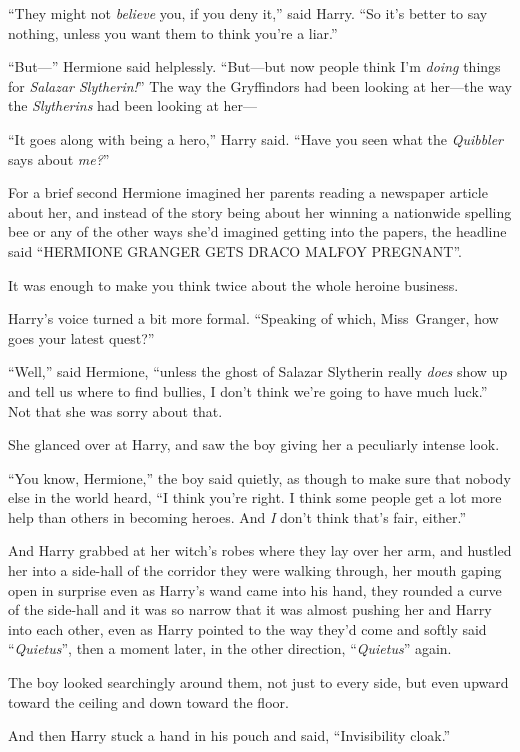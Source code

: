 “They might not \emph{believe} you, if you deny it,” said Harry. “So it’s better to say nothing, unless you want them to think you’re a liar.”

“But—” Hermione said helplessly. “But—but now people think I’m \emph{doing} things for \emph{Salazar Slytherin!}” The way the Gryffindors had been looking at her—the way the \emph{Slytherins} had been looking at her—

“It goes along with being a hero,” Harry said. “Have you seen what the \emph{Quibbler} says about \emph{me?}”

For a brief second Hermione imagined her parents reading a newspaper article about her, and instead of the story being about her winning a nationwide spelling bee or any of the other ways she’d imagined getting into the papers, the headline said “HERMIONE GRANGER GETS DRACO MALFOY PREGNANT”.

It was enough to make you think twice about the whole heroine business.

Harry’s voice turned a bit more formal. “Speaking of which, Miss~Granger, how goes your latest quest?”

“Well,” said Hermione, “unless the ghost of Salazar Slytherin really \emph{does} show up and tell us where to find bullies, I don’t think we’re going to have much luck.” Not that she was sorry about that.

She glanced over at Harry, and saw the boy giving her a peculiarly intense look.

“You know, Hermione,” the boy said quietly, as though to make sure that nobody else in the world heard, “I think you’re right. I think some people get a lot more help than others in becoming heroes. And \emph{I} don’t think that’s fair, either.”

And Harry grabbed at her witch’s robes where they lay over her arm, and hustled her into a side-hall of the corridor they were walking through, her mouth gaping open in surprise even as Harry’s wand came into his hand, they rounded a curve of the side-hall and it was so narrow that it was almost pushing her and Harry into each other, even as Harry pointed to the way they’d come and softly said “\emph{Quietus}”, then a moment later, in the other direction, “\emph{Quietus}” again.

The boy looked searchingly around them, not just to every side, but even upward toward the ceiling and down toward the floor.

And then Harry stuck a hand in his pouch and said, “Invisibility cloak.”

